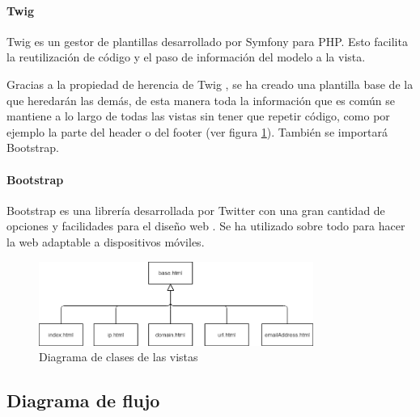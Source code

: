 \paragraph{Twig}
Twig es un gestor de plantillas desarrollado por Symfony \cite{Twig} para PHP. Esto facilita la reutilización de código y el paso de información del modelo a la vista.

Gracias a la propiedad de herencia de Twig \cite{twig_extends}, se ha creado una plantilla base de la que heredarán las demás, de esta manera toda la información que es común se mantiene a lo largo de todas las vistas sin tener que repetir código, como por ejemplo la parte del header o del footer (ver figura \ref{fig:DC_vistas}). También se importará Bootstrap. 

\paragraph{Bootstrap}
Bootstrap es una librería desarrollada por Twitter con una gran cantidad de opciones y facilidades para el diseño web \cite{Bootstrap}. 
Se ha utilizado sobre todo para hacer la web adaptable a dispositivos móviles.

\begin{figure}[htb]
    \centering
    \includegraphics[width=0.8\textwidth]{imagenes/DiagramasClases/Vistas.png}
\caption{Diagrama de clases de las vistas}
\label{fig:DC_vistas}
\end{figure}

\subsection{Diagrama de flujo}
